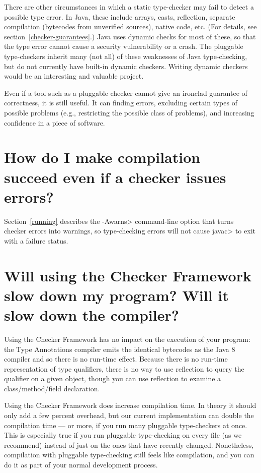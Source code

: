 There are other circumstances in which a static type-checker may fail to
detect a possible type error.  In Java, these include arrays, casts,
reflection, separate compilation (bytecodes from unverified sources),
native code, etc.  (For details, see section~\ref{checker-guarantees}.)
Java uses dynamic checks for most of these, so that the
type error cannot cause a security vulnerability or a crash.  The pluggable
type-checkers inherit many (not all) of these weaknesses of Java
type-checking, but do not currently have built-in dynamic checkers.
Writing dynamic checkers would be an interesting and valuable project.


Even if a tool such as a pluggable checker cannot give an ironclad
guarantee of correctness, it is still useful.  It can finding errors, 
excluding certain types of possible problems (e.g., restricting the
possible class of problems), and increasing confidence in a piece of
software.


\section{How do I make compilation succeed even if a checker issues errors?\label{faq-awarns}}

Section~\ref{running} describes the \<-Awarns> command-line
option that turns checker errors into warnings, so type-checking errors
will not cause \<javac> to exit with a failure status.


\section{Will using the Checker Framework slow down my program?  Will it slow down the compiler?\label{faq-slowdown}}

Using the Checker Framework has no impact on the execution of your program:
the Type Annotations compiler emits the identical bytecodes as the Java 8
compiler and so there is no run-time effect.  Because there is no run-time
representation of type qualifiers, there is no way to use reflection to
query the qualifier on a given object, though you can use reflection to
examine a class/method/field declaration.

Using the Checker Framework does increase compilation time.  In theory it
should only add a few percent overhead, but our current implementation
can double the compilation time --- or more, if you run many pluggable
type-checkers at once.  This is especially true if you run pluggable
type-checking on every file (as we recommend) instead of just on the ones
that have recently changed.
Nonetheless, compilation with pluggable type-checking still feels like
compilation, and you can do it as part of your normal development process.


